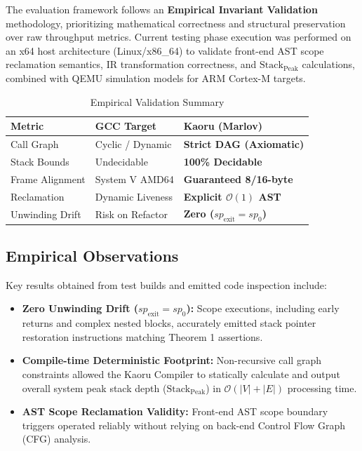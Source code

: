 \documentclass[conference]{IEEEtran}
\begin{document}
The evaluation framework follows an \textbf{Empirical Invariant Validation} methodology, prioritizing mathematical correctness and structural preservation over raw throughput metrics. Current testing phase execution was performed on an x64 host architecture (Linux/x86\_64) to validate front-end AST scope reclamation semantics, IR transformation correctness, and $\mathrm{Stack}_{\mathrm{Peak}}$ calculations, combined with QEMU simulation models for ARM Cortex-M targets.

\begin{table}[htbp]
\caption{Empirical Validation Summary}
\label{tab:validation}
\centering
\small
\begin{tabular}{lll}
\toprule
\textbf{Metric} & \textbf{GCC Target} & \textbf{Kaoru (Marlov)} \\
\midrule
Call Graph & Cyclic / Dynamic & \textbf{Strict DAG (Axiomatic)} \\
Stack Bounds & Undecidable & \textbf{100\% Decidable} \\
Frame Alignment & System V AMD64 & \textbf{Guaranteed 8/16-byte} \\
Reclamation & Dynamic Liveness & \textbf{Explicit $\mathcal{O}(1)$ AST} \\
Unwinding Drift & Risk on Refactor & \textbf{Zero ($sp_{\text{exit}} = sp_0$)} \\
\bottomrule
\end{tabular}
\end{table}


\subsection{Empirical Observations}
Key results obtained from test builds and emitted code inspection include:
\begin{itemize}
    \item \textbf{Zero Unwinding Drift ($sp_{\text{exit}} = sp_0$):} Scope executions, including early returns and complex nested blocks, accurately emitted stack pointer restoration instructions matching Theorem 1 assertions.
    \item \textbf{Compile-time Deterministic Footprint:} Non-recursive call graph constraints allowed the Kaoru Compiler to statically calculate and output overall system peak stack depth ($\mathrm{Stack}_{\mathrm{Peak}}$) in $\mathcal{O}(|V| + |E|)$ processing time.
    \item \textbf{AST Scope Reclamation Validity:} Front-end AST scope boundary triggers operated reliably without relying on back-end Control Flow Graph (CFG) analysis.
\end{itemize}
\end{document}
